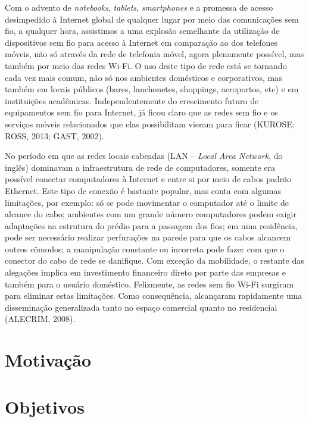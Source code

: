 Com o advento de \textit{notebooks}, \textit{tablets}, \textit{smartphones} e a promessa de acesso desimpedido à Internet global de qualquer lugar por meio das comunicações sem fio, a qualquer hora, assistimos a uma explosão semelhante da utilização de dispositivos sem fio para acesso à Internet em comparação ao dos telefones móveis, não só através da rede de telefonia móvel, agora plenamente possível, mas também por meio das redes Wi-Fi. O uso deste tipo de rede está se tornando cada vez mais comum, não só nos ambientes domésticos e corporativos, mas também em locais públicos (bares, lanchonetes, shoppings, aeroportos, etc) e em instituições acadêmicas. Independentemente do crescimento futuro de equipamentos sem fio para Internet, já ficou claro que as redes sem fio e os serviços móveis relacionados que elas possibilitam vieram para ficar (KUROSE; ROSS, 2013; GAST, 2002).

No período em que as redes locais cabeadas (LAN -- \textit{Local Area Network}, do inglês)  dominavam a infraestrutura de rede de computadores, somente era possível conectar computadores à Internet e entre si por meio de cabos padrão Ethernet. Este tipo de conexão é bastante popular, mas conta com algumas limitações, por exemplo: só se pode movimentar o computador até o limite de alcance do cabo; ambientes com um grande número computadores podem exigir adaptações na estrutura do prédio para a passagem dos fios; em uma residência, pode ser necessário realizar perfurações na parede para que os cabos alcancem outros cômodos; a manipulação constante ou incorreta pode fazer com que o conector do cabo de rede se danifique. Com exceção da mobilidade, o restante das alegações implica em investimento financeiro direto por parte das empresas e também para o usuário doméstico. Felizmente, as redes sem fio Wi-Fi surgiram para eliminar estas limitações. Como consequência, alcançaram rapidamente uma disseminação generalizada tanto no espaço comercial quanto no residencial (ALECRIM, 2008).


\newpage
\section{Motivação}
\label{sec:motivacao}


\section{Objetivos}
\label{sec:objetivos}

